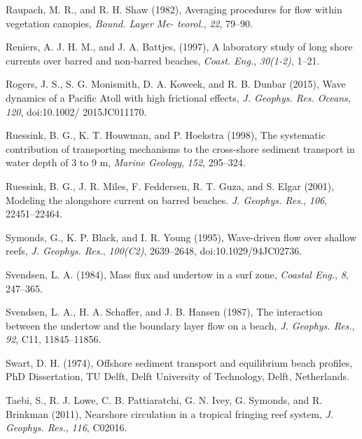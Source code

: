 \documentclass[default,jgrga]{agutex2015}
\begin{document}
\begin{article}
\begin{thebibliography}{}
Raupach, M. R., and R. H. Shaw (1982), Averaging procedures for flow within vegetation canopies, \textit{Bound. Layer Me-
teorol.}, \textit{22}, 79--90.

Reniers, A. J. H. M., and J. A. Battjes, (1997), A laboratory study of long shore currents over barred and non-barred beaches,  \textit{Coast. Eng.}, \textit{30(1-2)}, 1--21.

Rogers, J. S., S. G. Monismith, D. A. Koweek, and R. B. Dunbar (2015), Wave dynamics of a Pacific Atoll with high frictional effects, \textit{J. Geophys. Res. Oceans}, \textit{120}, doi:10.1002/ 2015JC011170.

Ruessink, B. G., K. T. Houwman, and P. Hoekstra (1998), The systematic contribution of transporting mechanisms to the cross-shore sediment transport in water depth of 3 to 9 m, \textit{Marine Geology}, \textit{152}, 295--324.

Ruessink, B. G., J. R. Miles, F. Feddersen, R. T. Guza, and S. Elgar (2001), Modeling the alongshore current on barred beaches.  \textit{J. Geophys. Res.}, \textit{106}, 22451--22464.

Symonds, G., K. P. Black, and I. R. Young (1995), Wave-driven flow over shallow reefs, \textit{J. Geophys. Res.}, \textit{100(C2)}, 2639--2648, doi:10.1029/94JC02736.

Svendsen, L. A. (1984), Mass flux and undertow in a surf zone, \textit{Coastal Eng.}, \textit{8}, 247--365.

Svendsen, L. A., H. A. Schaffer, and J. B. Hansen (1987), The interaction between the undertow and the boundary layer flow on a beach, \textit{J. Geophys. Res.}, \textit{92}, C11, 11845--11856.

Swart, D. H. (1974), Offshore sediment transport and equilibrium beach profiles, PhD Dissertation, TU Delft, Delft University of Technology, Delft, Netherlands.

Taebi, S., R. J. Lowe, C. B. Pattiaratchi, G. N. Ivey,  G. Symonds, and R. Brinkman (2011), Nearshore circulation in a
tropical fringing reef system, \textit{J. Geophys. Res.}, \textit{116}, C02016.


\end{thebibliography}
\end{article}
\end{document}
